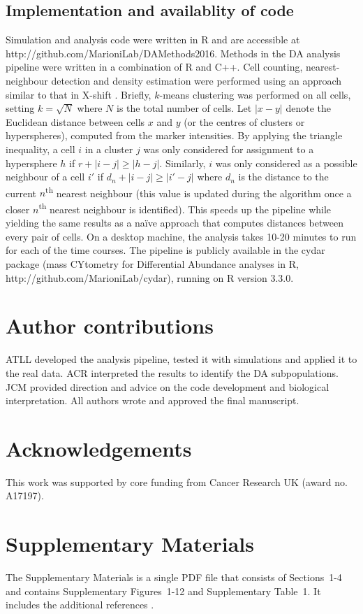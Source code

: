 \documentclass{article}
\newcommand{\suppannotate}{4}
\newcommand{\suppfigclusterreal}{12}
\begin{document}
\subsection{Implementation and availablity of code}
Simulation and analysis code were written in R and are accessible at {http://\-github.com/\-MarioniLab/\-DAMethods2016}.
Methods in the DA analysis pipeline were written in a combination of R and C++.
Cell counting, nearest-neighbour detection and density estimation were performed using an approach similar to that in X-shift \cite{samusik2016automated}.
Briefly, $k$-means clustering was performed on all cells, setting $k=\sqrt{N}$ where $N$ is the total number of cells.
Let $|x-y|$ denote the Euclidean distance between cells $x$ and $y$ (or the centres of clusters or hyperspheres), computed from the marker intensities.
By applying the triangle inequality, a cell $i$ in a cluster $j$ was only considered for assignment to a hypersphere $h$ if $r + |i-j| \ge |h-j|$.
Similarly, $i$ was only considered as a possible neighbour of a cell $i'$ if $d_n + |i-j| \ge |i'-j|$ where $d_n$ is the distance to the current $n$\textsuperscript{th} nearest neighbour (this value is updated during the algorithm once a closer $n$\textsuperscript{th} nearest neighbour is identified).
This speeds up the pipeline while yielding the same results as a na\"ive approach that computes distances between every pair of cells.
On a desktop machine, the analysis takes 10-20 minutes to run for each of the time courses.
The pipeline is publicly available in the cydar package (mass CYtometry for Differential Abundance analyses in R, http://\-github.com/\-MarioniLab/\-cydar), running on R version 3.3.0. 

\section{Author contributions}
ATLL developed the analysis pipeline, tested it with simulations and applied it to the real data. 
ACR interpreted the results to identify the DA subpopulations.
JCM provided direction and advice on the code development and biological interpretation.
All authors wrote and approved the final manuscript.

\section{Acknowledgements}
This work was supported by core funding from Cancer Research UK (award no. A17197).

\section{Supplementary Materials}
The Supplementary Materials is a single PDF file that consists of Sections~1-\suppannotate{} and contains Supplementary Figures~1-\suppfigclusterreal{} and Supplementary Table~1.
It includes the additional references \cite{benjamini1997multiple,robinson2010scaling,mccarthy2009treat}.



\end{document}
